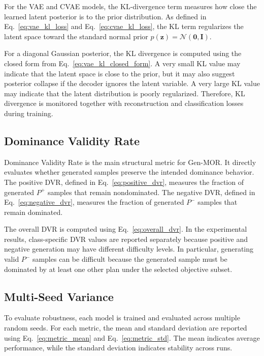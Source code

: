 For the VAE and CVAE models, the KL-divergence term measures how close the learned latent posterior is to the prior distribution. As defined in Eq.~\eqref{eq:vae_kl_loss} and Eq.~\eqref{eq:cvae_kl_loss}, the KL term regularizes the latent space toward the standard normal prior $p(\mathbf{z})=\mathcal{N}(\mathbf{0},\mathbf{I})$.

For a diagonal Gaussian posterior, the KL divergence is computed using the closed form from Eq.~\eqref{eq:vae_kl_closed_form}. A very small KL value may indicate that the latent space is close to the prior, but it may also suggest posterior collapse if the decoder ignores the latent variable. A very large KL value may indicate that the latent distribution is poorly regularized. Therefore, KL divergence is monitored together with reconstruction and classification losses during training.

\subsection{Dominance Validity Rate}
\label{subsec:metric_dvr}

Dominance Validity Rate is the main structural metric for Gen-MOR. It directly evaluates whether generated samples preserve the intended dominance behavior. The positive DVR, defined in Eq.~\eqref{eq:positive_dvr}, measures the fraction of generated $P^{+}$ samples that remain nondominated. The negative DVR, defined in Eq.~\eqref{eq:negative_dvr}, measures the fraction of generated $P^{-}$ samples that remain dominated.

The overall DVR is computed using Eq.~\eqref{eq:overall_dvr}. In the experimental results, class-specific DVR values are reported separately because positive and negative generation may have different difficulty levels. In particular, generating valid $P^{-}$ samples can be difficult because the generated sample must be dominated by at least one other plan under the selected objective subset.

\subsection{Multi-Seed Variance}
\label{subsec:metric_multiseed_variance}

To evaluate robustness, each model is trained and evaluated across multiple random seeds. For each metric, the mean and standard deviation are reported using Eq.~\eqref{eq:metric_mean} and Eq.~\eqref{eq:metric_std}. The mean indicates average performance, while the standard deviation indicates stability across runs.


